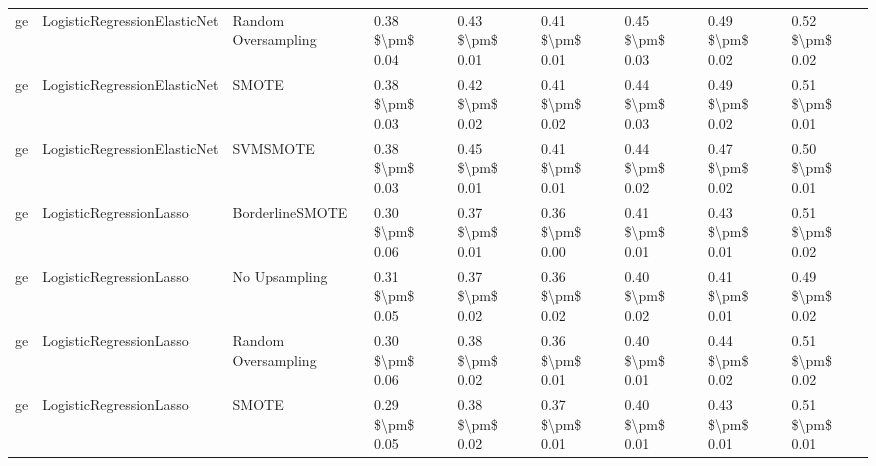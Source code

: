 \begin{tabular}{lllllllll}
      ge &    LogisticRegressionElasticNet &           Random Oversampling & 0.38 \$\textbackslash pm\$ 0.04 &           0.43 \$\textbackslash pm\$ 0.01 &       0.41 \$\textbackslash pm\$ 0.01 &        0.45 \$\textbackslash pm\$ 0.03 &                         0.49 \$\textbackslash pm\$ 0.02 &     0.52 \$\textbackslash pm\$ 0.02 \\
      ge &    LogisticRegressionElasticNet &                         SMOTE & 0.38 \$\textbackslash pm\$ 0.03 &           0.42 \$\textbackslash pm\$ 0.02 &       0.41 \$\textbackslash pm\$ 0.02 &        0.44 \$\textbackslash pm\$ 0.03 &                         0.49 \$\textbackslash pm\$ 0.02 &     0.51 \$\textbackslash pm\$ 0.01 \\
      ge &    LogisticRegressionElasticNet &                      SVMSMOTE & 0.38 \$\textbackslash pm\$ 0.03 &           0.45 \$\textbackslash pm\$ 0.01 &       0.41 \$\textbackslash pm\$ 0.01 &        0.44 \$\textbackslash pm\$ 0.02 &                         0.47 \$\textbackslash pm\$ 0.02 &     0.50 \$\textbackslash pm\$ 0.01 \\
      ge &         LogisticRegressionLasso &               BorderlineSMOTE & 0.30 \$\textbackslash pm\$ 0.06 &           0.37 \$\textbackslash pm\$ 0.01 &       0.36 \$\textbackslash pm\$ 0.00 &        0.41 \$\textbackslash pm\$ 0.01 &                         0.43 \$\textbackslash pm\$ 0.01 &     0.51 \$\textbackslash pm\$ 0.02 \\
      ge &         LogisticRegressionLasso &                 No Upsampling & 0.31 \$\textbackslash pm\$ 0.05 &           0.37 \$\textbackslash pm\$ 0.02 &       0.36 \$\textbackslash pm\$ 0.02 &        0.40 \$\textbackslash pm\$ 0.02 &                         0.41 \$\textbackslash pm\$ 0.01 &     0.49 \$\textbackslash pm\$ 0.02 \\
      ge &         LogisticRegressionLasso &           Random Oversampling & 0.30 \$\textbackslash pm\$ 0.06 &           0.38 \$\textbackslash pm\$ 0.02 &       0.36 \$\textbackslash pm\$ 0.01 &        0.40 \$\textbackslash pm\$ 0.01 &                         0.44 \$\textbackslash pm\$ 0.02 &     0.51 \$\textbackslash pm\$ 0.02 \\
      ge &         LogisticRegressionLasso &                         SMOTE & 0.29 \$\textbackslash pm\$ 0.05 &           0.38 \$\textbackslash pm\$ 0.02 &       0.37 \$\textbackslash pm\$ 0.01 &        0.40 \$\textbackslash pm\$ 0.01 &                         0.43 \$\textbackslash pm\$ 0.01 &     0.51 \$\textbackslash pm\$ 0.01 \\

\end{tabular}
